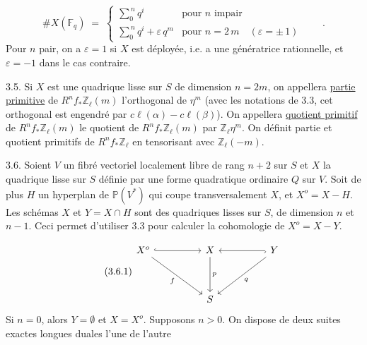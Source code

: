 \begin{equation*}
\# X(\mathbb{F}_q) \;=\; \left\{ \begin{array}{ll} \displaystyle\sum_{0}^{\,n} q^{i} & \mbox{pour } n \mbox{ impair} \\[3ex] \displaystyle\sum_{0}^{\,n} q^{i} + \varepsilon\, q^{m} & \mbox{pour } n = 2\,m \quad (\varepsilon = \pm\, 1) \end{array} \right. \qquad .
\end{equation*}
Pour $n$ pair, on a $\varepsilon = 1$ si $X$ est déployée, i.e. \quad a une génératrice rationnelle, et $\varepsilon = -1$ dans le cas contraire.

3.5. Si $X$ est une quadrique lisse sur $S$ de dimension $n = 2m$, on appellera \underline{partie primitive} de $R^{n}f_{*}\mathbb{Z}_{\ell}(m)$ l'orthogonal de $\eta^{m}$ (avec les notations de 3.3, cet orthogonal est engendré par $c\ell(\alpha)-c\ell(\beta)$). On appellera \underline{quotient primitif} de $R^{n}f_{*}\mathbb{Z}_{\ell}(m)$ le quotient de $R^{n}f_{*}\mathbb{Z}_{\ell}(m)$ par $\mathbb{Z}_{\ell}\eta^{m}$. On définit partie et quotient primitifs de $R^{n}f_{*}\mathbb{Z}_{\ell}$ en tensorisant avec $\mathbb{Z}_{\ell}(-m)$.

3.6. Soient $V$ un fibré vectoriel localement libre de rang $n + 2$ sur $S$ et $X$ la quadrique lisse sur $S$ définie par une forme quadratique ordinaire $Q$ sur $V$. Soit de plus $H$ un hyperplan de $\mathbb{P}(V^{*})$ qui coupe transversalement $X$, et $X^{o} = X - H$. Les schémas $X$ et $Y = X \cap H$ sont des quadriques lisses sur $S$, de dimension $n$ et $n - 1$. Ceci permet d'utiliser 3.3 pour calculer la cohomologie de $X^{o} = X - Y$.



\begin{equation}\tag{3.6.1}
\begin{tikzcd}[column sep=huge, row sep=huge]
X^{o} \arrow[r, hook] \arrow[rd, "f"'] & X \arrow[d, "p"] & Y \arrow[l, hook] \arrow[ld, "q"] \\
 & S &
\end{tikzcd}
\end{equation}
Si $n = 0$, alors $Y = \emptyset$ et $X = X^{o}$. Supposons $n > 0$. On dispose de deux suites exactes longues duales l'une de l'autre

